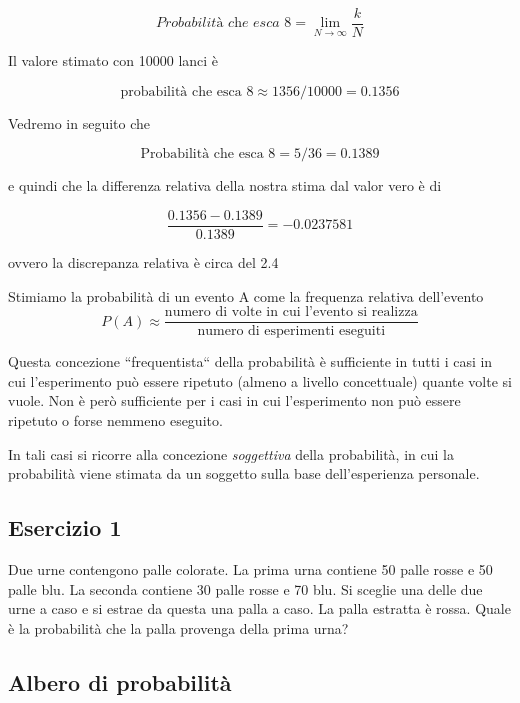 \documentclass[onecolumn,12pt]{book}\usepackage[]{graphicx}\usepackage[]{color}
\begin{document}
$$\textit{Probabilità che esca 8}=\lim_{N\to \infty}\dfrac{k}{N}$$
 
Il valore stimato con 10000 lanci è

$$\textrm{probabilità che esca 8} \approx 1356/10000 = 0.1356$$

 


Vedremo in seguito che

$$\textrm{Probabilità che esca 8} = 5/36=0.1389 $$

e quindi che la differenza relativa della nostra stima dal valor vero è di 

$$\dfrac{0.1356 -0.1389}{0.1389}=\ensuremath{-0.0237581}$$

ovvero la discrepanza relativa è circa del 2.4%

Stimiamo la probabilità di un evento A come la frequenza relativa dell'evento
$$P(A)\approx \dfrac{\textrm{numero di volte in cui l'evento si realizza}}{\textrm{numero di esperimenti 
eseguiti}}$$

 

Questa concezione ``frequentista`` della probabilità è sufficiente in tutti i casi in cui l'esperimento può essere ripetuto  (almeno a livello concettuale) quante volte si vuole.
Non è però sufficiente per i casi in cui l'esperimento non può essere ripetuto o forse nemmeno eseguito. 

 In tali casi si ricorre alla concezione \emph{soggettiva} della probabilità, in cui la probabilità viene stimata da un soggetto sulla base dell'esperienza personale. 


\subsection{Esercizio 1 }



Due urne contengono palle colorate. La prima urna contiene  50
palle rosse e 50 palle blu. La seconda contiene 30 palle rosse e 70 blu. Si sceglie una delle due urne a caso e si estrae da questa una palla a caso.  
La palla   estratta  è rossa. 
Quale è la probabilità che la palla provenga della prima urna?



\subsection{Albero di probabilità}
\end{document}
